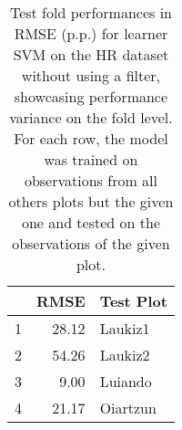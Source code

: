 \begin{table}[ht!]
\centering
\caption{Test fold performances in RMSE (p.p.) for learner SVM on the HR dataset without using a filter, showcasing performance variance on the fold level. For each row, the model was trained on observations from all others plots but the given one and tested on the observations of the given plot.} 
\label{tab:svm-single-fold-perf}
\begin{tabular}{rrl}
  \hline
 & RMSE & Test Plot \\ 
  \hline
1 & 28.12 & Laukiz1 \\ 
  2 & 54.26 & Laukiz2 \\ 
  3 & 9.00 & Luiando \\ 
  4 & 21.17 & Oiartzun \\ 
   \hline
\end{tabular}
\end{table}
